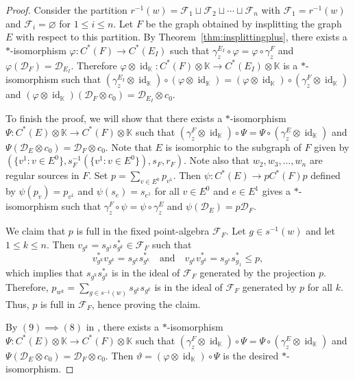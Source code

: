 \documentclass[12pt]{amsbook}%
\renewcommand{\phi}{\varphi}
\renewcommand{\theta}{\vartheta}
\theoremstyle{defin}
\theoremstyle{remark}
\numberwithin{equation}{chapter}
\numberwithin{theor}{section}
\newcommand{\K}{\mathbb{K}}
\renewcommand{\emptyset}{\varnothing}
\newcommand{\id}{\operatorname{id}}
\begin{document}
\begin{proof}
Consider the partition $r^{-1} (w) =  \mathcal{F}_1 \sqcup \mathcal{F}_2 \sqcup \cdots \sqcup \mathcal{F}_n$ with $\mathcal{F}_1 = r^{-1} (w)$ and $\mathcal{F}_i = \emptyset$ for $1 \leq i \leq n$.  Let $F$ be the graph obtained by insplitting the graph $E$ with respect to this partition.  By Theorem~\ref{thm:insplittingplus}, there exists a $*$-isomorphism $\phi \colon C^*( F ) \to C^*( E_I )$ such that $\gamma_z^{E_I} \circ \phi = \phi \circ \gamma_z^F$ and $\phi ( \mathcal{D}_F ) = \mathcal{D}_{E_I}$.  Therefore $\phi \otimes \id_{\K}  \colon C^*( F ) \otimes \K \to C^*( E_I ) \otimes \K $ is a  $*$-isomorphism such that $( \gamma_z^{E_I} \otimes \id_{\K} )\circ ( \phi \otimes \id_\K) = ( \phi \otimes \id_\K) \circ ( \gamma_z^F \otimes \id_\K)$ and $( \phi \otimes \id_\K)  ( \mathcal{D}_F \otimes c_0 ) = \mathcal{D}_{E_I} \otimes c_0$.

To finish the proof, we will show that there exists a $*$-isomorphism $\Psi \colon C^*(E) \otimes \K \to C^*( F ) \otimes \K$ such that $( \gamma_z^{F} \otimes \id_{\K} )\circ \Psi = \Psi \circ ( \gamma_z^E \otimes \id_\K)$ and $\Psi  ( \mathcal{D}_E \otimes c_0 ) = \mathcal{D}_{F} \otimes c_0$.  Note that $E$ is isomorphic to the subgraph of $F$ given by $( \{ v^1 : v \in E^0\} , s_F^{-1} ( \{ v^1 : v \in E^0\} ) , s_F, r_F )$.  Note also that $w_2, w_3, \ldots, w_n$ are regular sources in $F$.  Set $p = \sum_{ v \in E^0 } p_{v^1}$.  Then $\psi \colon C^*( E ) \to p C^*( F ) p$ defined by $\psi ( p_{v} ) = p_{v^1}$ and $\psi ( s_{e} ) = s_{ e^1}$ for all $v \in E^0$ and $e \in E^1$ gives a $*$-isomorphism such that $\gamma_z^F \circ \psi = \psi \circ \gamma_z^E$ and $\psi ( \mathcal{D}_E ) = p \mathcal{D}_F$. 

We claim that $p$ is full in the fixed point-algebra $\mathcal{F}_F$.  Let $g \in s^{-1} ( w )$ and let $1 \leq k \leq n$.  Then $v_{g^k} = s_{g^1} s_{g^k}^* \in \mathcal{F}_F$ such that 
\[
v_{g^k}^* v_{g^k} = s_{g^k } s_{g^k }^* \quad \text{and} \quad v_{g^k} v_{g^k}^* = s_{g^1} s_{g_1}^* \leq p,
\]  
which implies that $s_{g^k } s_{g^k }^*$ is in the ideal of $\mathcal{F}_F$ generated by the projection $p$.  Therefore, $p_{w^k} = \sum_{ g\in s^{-1} ( w ) } s_{g^k } s_{g^k }$ is in the ideal of $\mathcal{F}_F$ generated by $p$ for all $k$.  Thus, $p$ is full in $\mathcal{F}_F$, hence proving the claim.  

By $(9) \implies (8)$ in \cite[Corollary~11.3]{tmcerasmt:rgcds}, there exists a $*$-isomorphism $\Psi \colon C^*(E) \otimes \K \to C^*( F ) \otimes \K$ such that $( \gamma_z^{F} \otimes \id_{\K} )\circ \Psi = \Psi \circ ( \gamma_z^E \otimes \id_\K)$ and $\Psi  ( \mathcal{D}_E \otimes c_0 ) = \mathcal{D}_{F} \otimes c_0$.  Then $\theta = ( \phi \otimes \id_{\K} ) \circ \Psi$ is the desired $*$-isomorphism.
\end{proof}
\end{document}

